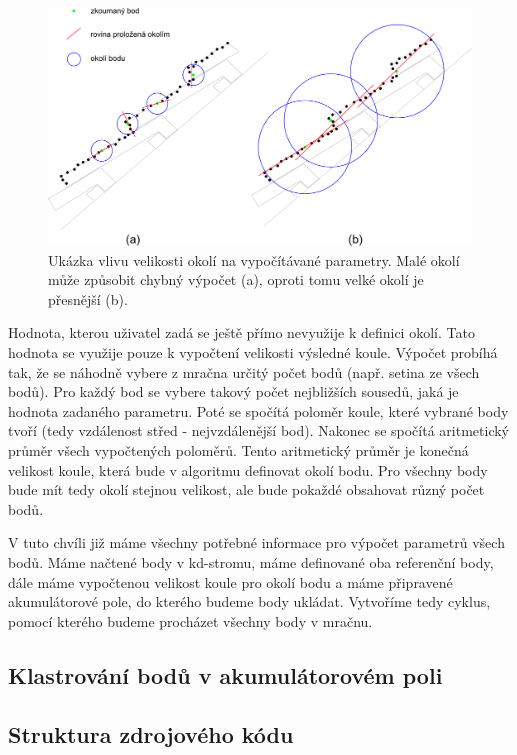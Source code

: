 \documentclass[11pt,twoside,a4paper]{book}
\begin{document}
\begin{figure}[ht]
\begin{center}
\includegraphics[width=\textwidth]{figures/strecha-all}
\caption{Ukázka vlivu velikosti okolí na vypočítávané parametry. Malé okolí může způsobit chybný výpočet (a), oproti tomu velké okolí je přesnější (b).}
\label{fig:strecha}
\end{center}
\end{figure}

Hodnota, kterou uživatel zadá se ještě přímo nevyužije k definici okolí. Tato hodnota se využije pouze k vypočtení velikosti výsledné koule. Výpočet probíhá tak, že se náhodně vybere z mračna určitý počet bodů (např. setina ze všech bodů). Pro každý bod se vybere takový počet nejbližších sousedů, jaká je hodnota zadaného parametru. Poté se spočítá poloměr koule, které vybrané body tvoří (tedy vzdálenost střed - nejvzdálenější bod). Nakonec se spočítá aritmetický průměr všech vypočtených poloměrů. Tento aritmetický průměr je konečná velikost koule, která bude v algoritmu definovat okolí bodu. Pro všechny body bude mít tedy okolí stejnou velikost, ale bude pokaždé obsahovat různý počet bodů.

V tuto chvíli již máme všechny potřebné informace pro výpočet parametrů všech bodů. Máme načtené body v kd-stromu, máme definované oba referenční body, dále máme vypočtenou velikost koule pro okolí bodu a máme připravené akumulátorové pole, do kterého budeme body ukládat. Vytvoříme tedy cyklus, pomocí kterého budeme procházet všechny body v mračnu.


\subsection{Klastrování bodů v akumulátorovém poli}


\subsection{Struktura zdrojového kódu}
\end{document}
